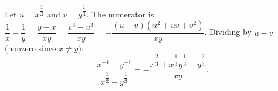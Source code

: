 Let $u=x^{\dfrac{1}{3}}$ and $v=y^{\dfrac{1}{3}}$. The numerator is $\dfrac{1}{x}-\dfrac{1}{y}=\dfrac{y-x}{xy}=\dfrac{v^3-u^3}{xy}=-\dfrac{(u-v)(u^2+uv+v^2)}{xy}$. Dividing by $u-v$ (nonzero since $x\ne y$):
\[\dfrac{x^{-1}-y^{-1}}{x^{\dfrac{1}{3}}-y^{\dfrac{1}{3}}}=\boxed{-\dfrac{x^{\dfrac{2}{3}}+x^{\dfrac{1}{3}}y^{\dfrac{1}{3}}+y^{\dfrac{2}{3}}}{xy}}.\]
